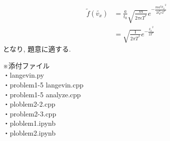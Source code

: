 \documentclass[a4paper,dvipdfmx]{jarticle}
\begin{document}
\begin{align*}
    \tilde{f}(\tilde{v_x}) &= \frac{a}{t_0}\sqrt{\frac{m}{2\pi \epsilon T^*}}e^{-\frac{ma^2\tilde{v_x}^2}{2t_0^2\epsilon T^*}} \\
    &= \sqrt{\frac{1}{2\pi T^*}}e^{-\frac{\tilde{v_x}^2}{2T^*}} \tag{2.8}
\end{align*}
となり, 題意に適する.


\newpage
\noindent
※添付ファイル \\
・langevin.py \\
・problem1-5 langevin.cpp \\
・problem1-5 analyze.cpp \\
・ploblem2-2.cpp \\
・problem2-3.cpp  \\
・ploblem1.ipynb \\
・ploblem2.ipynb
\end{document}
